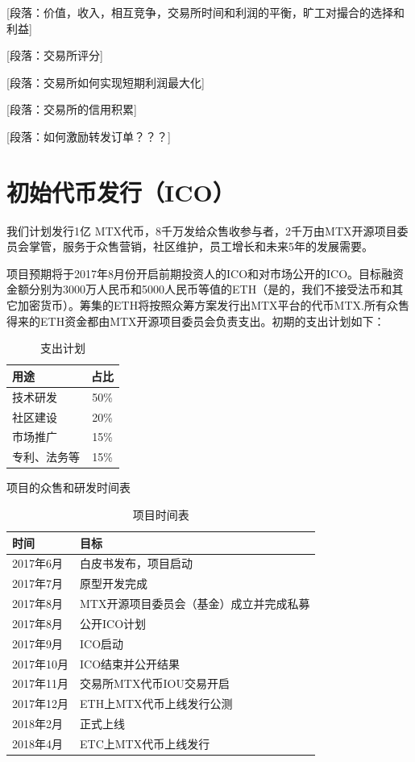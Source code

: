 \documentclass[UTF8,nofonts]{ctexart}
\begin{document}
[段落：价值，收入，相互竞争，交易所时间和利润的平衡，旷工对撮合的选择和利益]

[段落：交易所评分]

[段落：交易所如何实现短期利润最大化]

[段落：交易所的信用积累]



[段落：如何激励转发订单？？？]


\section{初始代币发行（ICO）\label{sec:ico}}

我们计划发行1亿 MTX代币，8千万发给众售收参与者，2千万由MTX开源项目委员会掌管，服务于众售营销，社区维护，员工增长和未来5年的发展需要。

项目预期将于2017年8月份开启前期投资人的ICO和对市场公开的ICO。目标融资金额分别为3000万人民币和5000人民币等值的ETH（是的，我们不接受法币和其它加密货币）。筹集的ETH将按照众筹方案发行出MTX平台的代币MTX.所有众售得来的ETH资金都由MTX开源项目委员会负责支出。初期的支出计划如下：

\begin{table}[hbt]
  \centering
  \begin{tabular}{l|c}
 用途   & 占比\\
    \hline
  技术研发 & 50\% \\
  社区建设 & 20\% \\
  市场推广 & 15\% \\
  专利、法务等 & 15\% \\
  \end{tabular}
  \caption{支出计划}
\end{table}


项目的众售和研发时间表
\begin{table}[hbt]
  \centering
  \begin{tabular}{l|l}
 时间   & 目标\\
    \hline
  2017年6月 & 白皮书发布，项目启动 \\
  2017年7月 & 原型开发完成 \\
  2017年8月 & MTX开源项目委员会（基金）成立并完成私募 \\
  2017年8月 & 公开ICO计划 \\
  2017年9月 & ICO启动 \\
  2017年10月 & ICO结束并公开结果 \\
  2017年11月 & 交易所MTX代币IOU交易开启 \\
  2017年12月 & ETH上MTX代币上线发行公测 \\
  2018年2月 & 正式上线 \\
  2018年4月 & ETC上MTX代币上线发行 \\
  \end{tabular}
  \caption{项目时间表}
\end{table}
\end{document}
